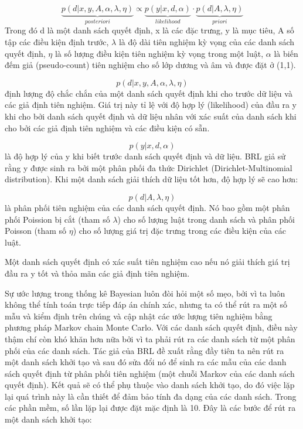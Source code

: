 $$\underbrace{p(d|x,y,A,\alpha,\lambda,\eta)}_{posteriori}\propto\underbrace{p(y|x,d,\alpha)}_{likelihood}\cdot\underbrace{p(d|A,\lambda,\eta)}_{priori}$$
Trong đó d là một danh sách quyết định, x là các đặc trưng, y là mục tiêu, A số tập các điều kiện định trước, $\lambda$ là độ dài tiên nghiệm kỳ vọng của các danh sách quyết định, $\eta$ là số lượng điều kiện tiên nghiệm kỳ vọng trong một luật, $\alpha$ là biến đếm giả (pseudo-count) tiên nghiệm cho số lớp dương và âm và được đặt ở (1,1).

$$p(d|x,y,A,\alpha,\lambda,\eta)$$
định lượng độ chắc chắn của một danh sách quyết định khi cho trước dữ liệu và các giả định tiên nghiệm. Giá trị này tỉ lệ với độ hợp lý (likelihood) của đầu ra y khi cho bởi danh sách quyết định và dữ liệu nhân với xác suất của danh sách khi cho bởi các giả định tiên nghiệm và các điều kiện có sẵn.

$$p(y|x,d,\alpha)$$
là độ hợp lý của y khi biết trước danh sách quyết định và dữ liệu. BRL giả sử rằng y được sinh ra bởi một phân phối đa thức Dirichlet (Dirichlet-Multinomial distribution). Khi một danh sách giải thích dữ liệu tốt hơn, độ hợp lý sẽ cao hơn:

$$p(d|A,\lambda,\eta)$$
là phân phối tiên nghiệm của các danh sách quyết định. Nó bao gồm một phân phối Poission bị cắt (tham số $\lambda$) cho số lượng luật trong danh sách và phân phối Poisson (tham số $\eta$) cho số lượng giá trị đặc trưng trong các điều kiện của các luật.

Một danh sách quyết định có xác suất tiên nghiệm cao nếu nó giải thích giá trị đầu ra y tốt và thỏa mãn các giả định tiên nghiệm.

Sự ước lượng trong thống kê Bayesian luôn đòi hỏi một số mẹo, bởi vì ta luôn không thể tính toán trực tiếp đáp án chính xác, nhưng ta có thể rút ra một số mẫu và kiểm định trên chúng và cập nhật các ước lượng tiên nghiệm bằng phương pháp Markov chain Monte Carlo. Với các danh sách quyết định, điều này thậm chí còn khó khăn hơn nữa bởi vì ta phải rút ra các danh sách từ một phân phối của các danh sách. Tác giả của BRL đề xuất rằng đầy tiên ta nên rút ra một danh sách khởi tạo và sau đó sửa đổi nó để sinh ra các mẫu của các danh sách quyết định từ phân phối tiên nghiệm (một chuỗi Markov của các danh sách quyết định). Kết quả sẽ có thể phụ thuộc vào danh sách khởi tạo, do đó việc lặp lại quá trình này là cần thiết để đảm bảo tính đa dạng của các danh sách. Trong các phần mềm, số lần lặp lại được đặt mặc định là 10. Đây là các bước để rút ra một danh sách khởi tạo:

